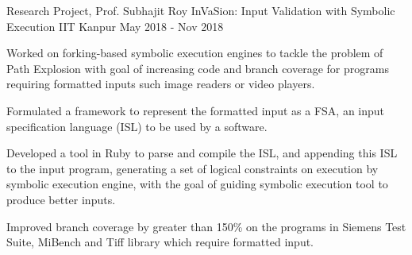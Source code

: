 \begin{cventries}


  \cventry
    {Research Project, Prof. Subhajit Roy} %
    {InVaSion: Input Validation with Symbolic Execution} %
    {IIT Kanpur} %
    {May 2018 - Nov 2018} %
    {
      \begin{cvitems} %
      \item {Worked on forking-based symbolic execution engines to tackle the problem of Path Explosion with goal of increasing code and branch coverage for programs requiring formatted inputs such image readers or video players.}
      \item {Formulated a framework to represent the formatted input as a FSA, an input specification language (ISL) to be used by a software.}
        \item {Developed a tool in Ruby to parse and compile the ISL, and appending this ISL to the input program, generating a set of logical constraints on execution by symbolic execution engine, with the goal of guiding symbolic execution tool to produce better inputs.}
        \item {Improved branch coverage by greater than 150\% on the programs in Siemens Test Suite, MiBench and Tiff library which require formatted input.}
      \end{cvitems}
    }%







\end{cventries}
